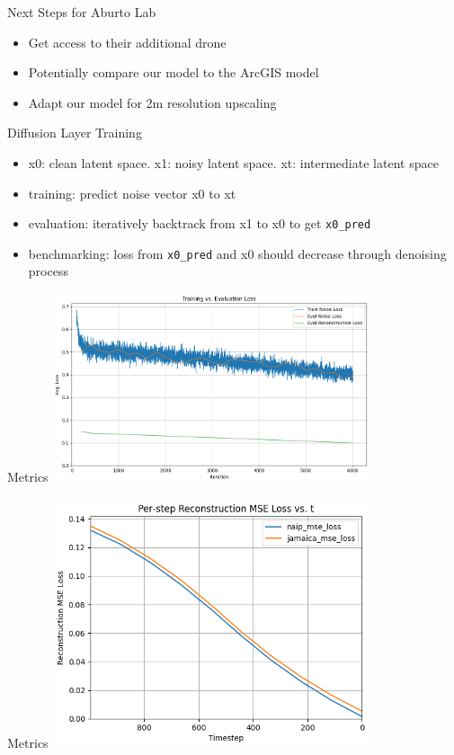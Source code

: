 \begin{frame}{Next Steps for Aburto Lab}
    \begin{itemize}
        \item Get access to their additional drone
        \item Potentially compare our model to the ArcGIS model
        \item Adapt our model for 2m resolution upscaling
    \end{itemize}

    
\end{frame}

\begin{frame}{Diffusion Layer Training}
  \begin{itemize}
      \item x0: clean latent space. x1: noisy latent space. xt: intermediate latent space
      \item training: predict noise vector x0 to xt
      \item evaluation: iteratively backtrack from x1 to x0 to get \texttt{x0\_pred}
      \item benchmarking: loss from \texttt{x0\_pred} and x0 should decrease through denoising process
  \end{itemize}    
\end{frame}

\begin{frame}{Metrics}
  \centering
  \includegraphics[height=0.7\textheight,width=0.7\textwidth,keepaspectratio]{images/diff4_loss.png}
\end{frame}

\begin{frame}{Metrics}
  \centering
  \includegraphics[height=0.7\textheight,width=0.7\textwidth,keepaspectratio]{images/diff4_reconstruct.png}
\end{frame}
